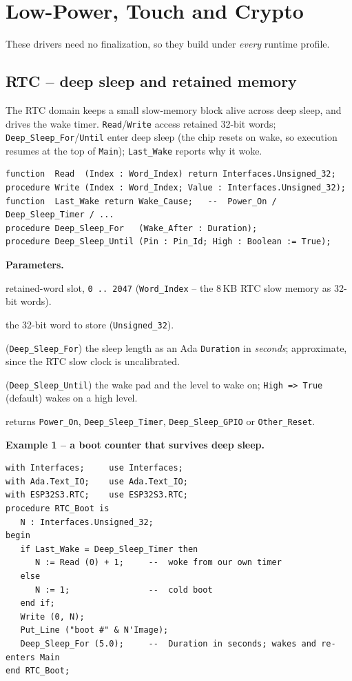 \chapter{Low-Power, Touch and Crypto}
\label{ch:hal3}

These drivers need no finalization, so they build under \emph{every} runtime
profile.

\section{RTC -- deep sleep and retained memory}

The RTC domain keeps a small slow-memory block alive across deep sleep, and
drives the wake timer. \texttt{Read}/\texttt{Write} access retained 32-bit words;
\texttt{Deep\_Sleep\_For}/\texttt{Until} enter deep sleep (the chip resets on
wake, so execution resumes at the top of \texttt{Main}); \texttt{Last\_Wake}
reports why it woke.

\begin{lstlisting}
function  Read  (Index : Word_Index) return Interfaces.Unsigned_32;
procedure Write (Index : Word_Index; Value : Interfaces.Unsigned_32);
function  Last_Wake return Wake_Cause;   --  Power_On / Deep_Sleep_Timer / ...
procedure Deep_Sleep_For   (Wake_After : Duration);
procedure Deep_Sleep_Until (Pin : Pin_Id; High : Boolean := True);
\end{lstlisting}

\textbf{Parameters.}
\begin{description}[style=nextline]
\item[\texttt{Index}] retained-word slot, \texttt{0\,..\,2047}
  (\texttt{Word\_Index} -- the 8\,KB RTC slow memory as 32-bit words).
\item[\texttt{Value}] the 32-bit word to store (\texttt{Unsigned\_32}).
\item[\texttt{Wake\_After}] (\texttt{Deep\_Sleep\_For}) the sleep length as an Ada
  \texttt{Duration} in \emph{seconds}; approximate, since the RTC slow clock is
  uncalibrated.
\item[\texttt{Pin}, \texttt{High}] (\texttt{Deep\_Sleep\_Until}) the wake pad and
  the level to wake on; \texttt{High => True} (default) wakes on a high level.
\item[\texttt{Last\_Wake}] returns \texttt{Power\_On}, \texttt{Deep\_Sleep\_Timer},
  \texttt{Deep\_Sleep\_GPIO} or \texttt{Other\_Reset}.
\end{description}

\textbf{Example 1 -- a boot counter that survives deep sleep.}
\begin{lstlisting}
with Interfaces;     use Interfaces;
with Ada.Text_IO;    use Ada.Text_IO;
with ESP32S3.RTC;    use ESP32S3.RTC;
procedure RTC_Boot is
   N : Interfaces.Unsigned_32;
begin
   if Last_Wake = Deep_Sleep_Timer then
      N := Read (0) + 1;     --  woke from our own timer
   else
      N := 1;                --  cold boot
   end if;
   Write (0, N);
   Put_Line ("boot #" & N'Image);
   Deep_Sleep_For (5.0);     --  Duration in seconds; wakes and re-enters Main
end RTC_Boot;
\end{lstlisting}

